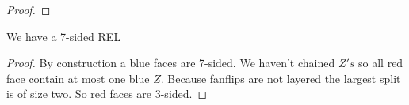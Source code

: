 \begin{proof}
\end{proof}


\begin{lemma}
  \label{lm:}
  We have a 7-sided REL
\end{lemma}

\begin{proof}
  By construction a blue faces are 7-sided. We haven't chained $Z's$ so all red face contain at most one blue $Z$. Because fanflips are not layered the largest split is of size two. So red faces are 3-sided.
\end{proof}
